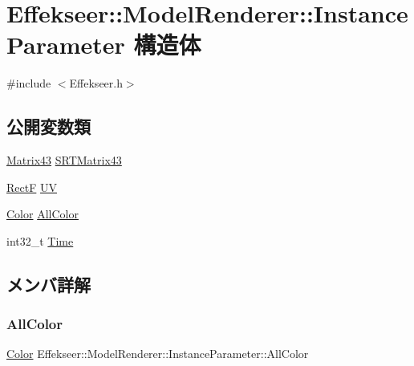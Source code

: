 \hypertarget{struct_effekseer_1_1_model_renderer_1_1_instance_parameter}{}\section{Effekseer\+:\+:Model\+Renderer\+:\+:Instance\+Parameter 構造体}
\label{struct_effekseer_1_1_model_renderer_1_1_instance_parameter}


{\ttfamily \#include $<$Effekseer.\+h$>$}

\subsection*{公開変数類}
\begin{DoxyCompactItemize}
\item 
\mbox{\hyperlink{struct_effekseer_1_1_matrix43}{Matrix43}} \mbox{\hyperlink{struct_effekseer_1_1_model_renderer_1_1_instance_parameter_a9f939c1f03b94d5c76eea7c7ff461da3}{S\+R\+T\+Matrix43}}
\item 
\mbox{\hyperlink{struct_effekseer_1_1_rect_f}{RectF}} \mbox{\hyperlink{struct_effekseer_1_1_model_renderer_1_1_instance_parameter_a8093686e2945cecdfcb99420bacca07d}{UV}}
\item 
\mbox{\hyperlink{struct_effekseer_1_1_color}{Color}} \mbox{\hyperlink{struct_effekseer_1_1_model_renderer_1_1_instance_parameter_a5d22e2c41cd40b037704fc7c41d7688a}{All\+Color}}
\item 
int32\+\_\+t \mbox{\hyperlink{struct_effekseer_1_1_model_renderer_1_1_instance_parameter_a4235d902c37f8a39353fc27bbc0ea532}{Time}}
\end{DoxyCompactItemize}


\subsection{メンバ詳解}
\mbox{\label{struct_effekseer_1_1_model_renderer_1_1_instance_parameter_a5d22e2c41cd40b037704fc7c41d7688a}} 
\subsubsection{\texorpdfstring{All\+Color}{AllColor}}
{\footnotesize\ttfamily \mbox{\hyperlink{struct_effekseer_1_1_color}{Color}} Effekseer\+::\+Model\+Renderer\+::\+Instance\+Parameter\+::\+All\+Color}

